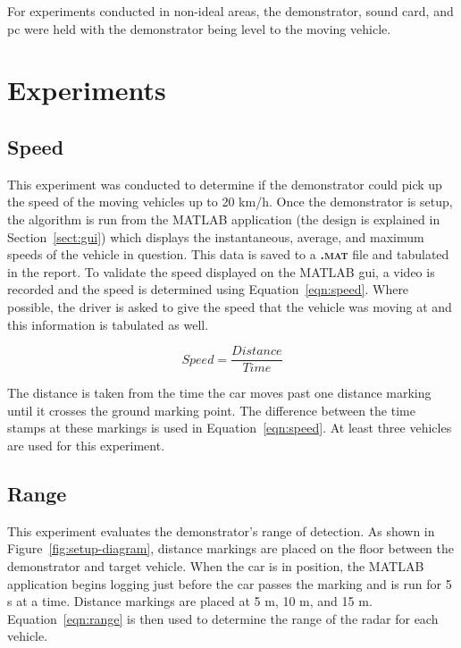 \documentclass[class=report,11pt,crop=false]{standalone}
\begin{document}
For experiments conducted in non-ideal areas, the demonstrator, sound card, and \gls{pc} were held with the demonstrator being level to the moving vehicle.

\section{Experiments}
\subsection{Speed}\label{subsect:speed}
This experiment was conducted to determine if the demonstrator could pick up the speed of the moving vehicles up to 20 km/h. Once the demonstrator is setup, the algorithm is run from the \textsc{MATLAB} application (the design is explained in Section~\ref{sect:gui}) which displays the instantaneous, average, and maximum speeds of the vehicle in question. This data is saved to a \textbf{\textsc{.mat}} file and tabulated in the report. To validate the speed displayed on the \textsc{MATLAB} \gls{gui}, a video is recorded and the speed is determined using Equation~\ref{eqn:speed}. Where possible, the driver is asked to give the speed that the vehicle was moving at and this information is tabulated as well.

\begin{equation}
    Speed = \frac{Distance}{Time}
    \label{eqn:speed}
\end{equation}

The distance is taken from the time the car moves past one distance marking until it crosses the ground marking point. The difference between the time stamps at these markings is used in Equation~\ref{eqn:speed}. At least three vehicles are used for this experiment.

\subsection{Range}\label{subsect:range}
This experiment evaluates the demonstrator's range of detection. As shown in Figure~\ref{fig:setup-diagram}, distance markings are placed on the floor between the demonstrator and target vehicle. When the car is in position, the \textsc{MATLAB} application begins logging just before the car passes the marking and is run for 5 s at a time. Distance markings are placed at 5 m, 10 m, and 15 m. Equation~\ref{eqn:range} is then used to determine the range of the radar for each vehicle.

\end{document}
